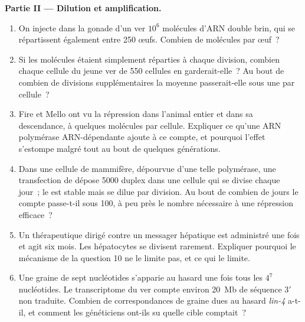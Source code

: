 \begin{problem}
\medskip
\noindent\textbf{Partie II --- Dilution et amplification.}
\begin{enumerate}[resume]
  \item On injecte dans la gonade d'un ver $10^{6}$ molécules d'ARN
        double brin, qui se répartissent également entre \num{250}
        œufs. Combien de molécules par œuf~?
  \item Si les molécules étaient simplement réparties à chaque
        division, combien chaque cellule du jeune ver de \num{550}
        cellules en garderait-elle~? Au bout de combien de divisions
        supplémentaires la moyenne passerait-elle sous une par cellule~?
  \item Fire et Mello ont vu la répression dans l'animal entier et dans
        sa descendance, à quelques molécules par cellule. Expliquer ce
        qu'une ARN polymérase ARN-dépendante ajoute à ce compte, et
        pourquoi l'effet s'estompe malgré tout au bout de quelques
        générations.
  \item Dans une cellule de mammifère, dépourvue d'une telle
        polymérase, une transfection de  dépose \num{5000} duplex
        dans une cellule qui se divise chaque jour~; le  est stable
        mais se dilue par division. Au bout de combien de jours le
        compte passe-t-il sous \num{100}, à peu près le nombre
        nécessaire à une répression efficace~?
  \item Un  thérapeutique dirigé contre un messager hépatique est
        administré une fois et agit six mois. Les hépatocytes se
        divisent rarement. Expliquer pourquoi le mécanisme de la
        question 10 ne le limite pas, et ce qui le limite.
  \item Une graine de sept nucléotides s'apparie au hasard une fois
        tous les $4^{7}$ nucléotides. Le transcriptome du ver compte
        environ \qty{20}{Mb} de séquence 3$'$ non traduite. Combien de
        correspondances de graine dues au hasard \emph{lin-4} a-t-il,
        et comment les généticiens ont-ils su quelle cible comptait~?
\end{enumerate}


\end{problem}
